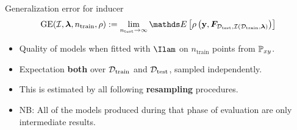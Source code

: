 \documentclass[11pt,compress,t,notes=noshow, xcolor=table]{beamer}
\begin{document}
\begin{vbframe}{Generalization error for inducer}
  $$\GEfull := 
  \lim_{\ntest \rightarrow \infty} \E \left[ \rho \left(
  \yv, \F_{\Dtest, \ind(\D_{\mathrm{train}}, \lamv)} 
  \right)\right]$$

\begin{itemize}
  \item Quality of models when fitted with $\Ilam$ on 
      $n_{\mathrm{train}}$ points from $\mathbb{P}_{xy}$.
  \item Expectation \textbf{both} over $\mathcal{D}_{\text{train}}$ and $\mathcal{D}_{\text{test}}$, sampled independently.
  \item This is estimated by all following \textbf{resampling} procedures. 
  \item NB: All of the models produced during that phase of evaluation are only
    intermediate results.
\end{itemize}
\end{vbframe}
\end{document}
